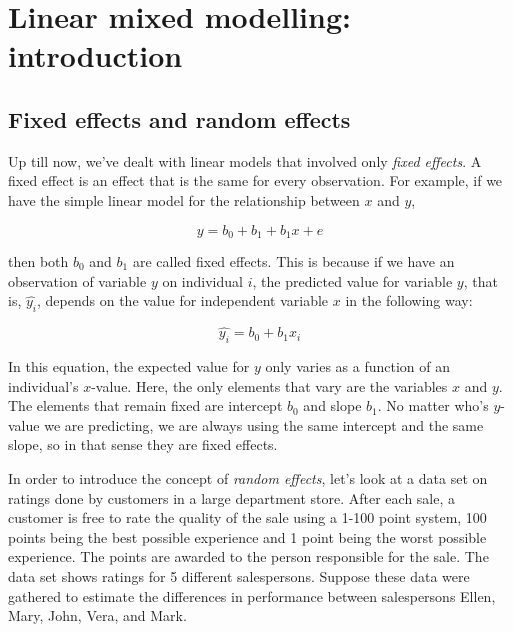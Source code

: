 
\chapter{Linear mixed modelling: introduction}\label{chap:mixed}


\section{Fixed effects and random effects}

Up till now, we've dealt with linear models that involved only \textit{fixed effects}. A fixed effect is an effect that is the same for every observation. For example, if we have the simple linear model for the relationship between $x$ and $y$,

\begin{equation}
y = b_0 + b_1 + b_1x + e
\end{equation}

then both $b_0$ and $b_1$ are called fixed effects. This is because if we have an observation of variable $y$ on individual $i$, the predicted value for variable $y$, that is, $\hat{y_i}$, depends on the value for independent variable $x$ in the following way:

\begin{equation}
\hat{y_i} = b_0 + b_1x_i
\end{equation}

In this equation, the expected value for $y$ only varies as a function of an individual's $x$-value. Here, the only elements that vary are the variables $x$ and $y$. The elements that remain fixed are intercept $b_0$ and slope $b_1$. No matter who's $y$-value we are predicting, we are always using the same intercept and the same slope, so in that sense they are fixed effects.

In order to introduce the concept of \textit{random effects}, let's look at a data set on ratings done by customers in a large department store. After each sale, a customer is free to rate the quality of the sale using a 1-100 point system, 100 points being the best possible experience and 1 point being the worst possible experience. The points are awarded to the person responsible for the sale. The data set shows ratings for 5 different salespersons. Suppose these data were gathered to estimate the differences in performance between salespersons Ellen, Mary, John, Vera, and Mark.

